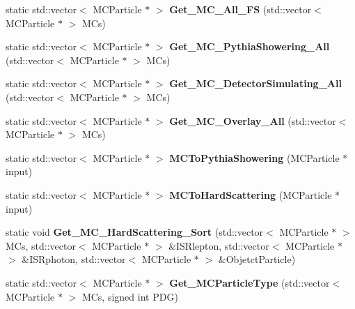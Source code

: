 \begin{DoxyCompactItemize}
\item 
\hypertarget{classToolSet_1_1CMC_a826b4fcc4ae58b18ceec544fb5abf563}{
static std::vector$<$ MCParticle $\ast$ $>$ {\bfseries Get\_\-MC\_\-All\_\-FS} (std::vector$<$ MCParticle $\ast$ $>$ MCs)}
\label{classToolSet_1_1CMC_a826b4fcc4ae58b18ceec544fb5abf563}

\item 
\hypertarget{classToolSet_1_1CMC_a96c8f9998df8b19c84b0f45271195ef9}{
static std::vector$<$ MCParticle $\ast$ $>$ {\bfseries Get\_\-MC\_\-PythiaShowering\_\-All} (std::vector$<$ MCParticle $\ast$ $>$ MCs)}
\label{classToolSet_1_1CMC_a96c8f9998df8b19c84b0f45271195ef9}

\item 
\hypertarget{classToolSet_1_1CMC_a8581240b2a8d474e851c3c1ed256fada}{
static std::vector$<$ MCParticle $\ast$ $>$ {\bfseries Get\_\-MC\_\-DetectorSimulating\_\-All} (std::vector$<$ MCParticle $\ast$ $>$ MCs)}
\label{classToolSet_1_1CMC_a8581240b2a8d474e851c3c1ed256fada}

\item 
\hypertarget{classToolSet_1_1CMC_a4bf55a4d64eeec4762f87ee7de91f585}{
static std::vector$<$ MCParticle $\ast$ $>$ {\bfseries Get\_\-MC\_\-Overlay\_\-All} (std::vector$<$ MCParticle $\ast$ $>$ MCs)}
\label{classToolSet_1_1CMC_a4bf55a4d64eeec4762f87ee7de91f585}

\item 
\hypertarget{classToolSet_1_1CMC_a38ef7e0f75f14714d4636ca70c1b717c}{
static std::vector$<$ MCParticle $\ast$ $>$ {\bfseries MCToPythiaShowering} (MCParticle $\ast$input)}
\label{classToolSet_1_1CMC_a38ef7e0f75f14714d4636ca70c1b717c}

\item 
\hypertarget{classToolSet_1_1CMC_adfd54e8274a8994f4cc0a531a028cd01}{
static std::vector$<$ MCParticle $\ast$ $>$ {\bfseries MCToHardScattering} (MCParticle $\ast$input)}
\label{classToolSet_1_1CMC_adfd54e8274a8994f4cc0a531a028cd01}

\item 
\hypertarget{classToolSet_1_1CMC_abf41aa5efde937a3e21fa3b24323d570}{
static void {\bfseries Get\_\-MC\_\-HardScattering\_\-Sort} (std::vector$<$ MCParticle $\ast$ $>$ MCs, std::vector$<$ MCParticle $\ast$ $>$ \&ISRlepton, std::vector$<$ MCParticle $\ast$ $>$ \&ISRphoton, std::vector$<$ MCParticle $\ast$ $>$ \&ObjetctParticle)}
\label{classToolSet_1_1CMC_abf41aa5efde937a3e21fa3b24323d570}

\item 
\hypertarget{classToolSet_1_1CMC_a0595ad7853b51cfc631547665a3cb63e}{
static std::vector$<$ MCParticle $\ast$ $>$ {\bfseries Get\_\-MCParticleType} (std::vector$<$ MCParticle $\ast$ $>$ MCs, signed int PDG)}
\label{classToolSet_1_1CMC_a0595ad7853b51cfc631547665a3cb63e}


\end{DoxyCompactItemize}
